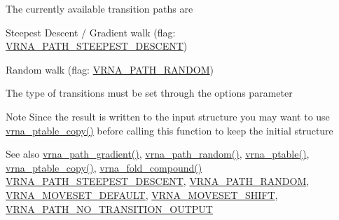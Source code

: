 The currently available transition paths are
\begin{DoxyItemize}
\item Steepest Descent / Gradient walk (flag\+: \hyperlink{group__paths_ga705cea2b3243a38a2d6e3b1e141ed061}{V\+R\+N\+A\+\_\+\+P\+A\+T\+H\+\_\+\+S\+T\+E\+E\+P\+E\+S\+T\+\_\+\+D\+E\+S\+C\+E\+NT})
\item Random walk (flag\+: \hyperlink{group__paths_ga0b84bd36bfd783130297797c51dd85ae}{V\+R\+N\+A\+\_\+\+P\+A\+T\+H\+\_\+\+R\+A\+N\+D\+OM})
\end{DoxyItemize}

The type of transitions must be set through the {\ttfamily options} parameter

\begin{DoxyNote}{Note}
Since the result is written to the input structure you may want to use \hyperlink{group__struct__utils_ga2daefbbd6d9f8803731651882f54332d}{vrna\+\_\+ptable\+\_\+copy()} before calling this function to keep the initial structure
\end{DoxyNote}
\begin{DoxySeeAlso}{See also}
\hyperlink{group__paths_gae92cce443a8a64f7b7fb89867b7d6125}{vrna\+\_\+path\+\_\+gradient()}, \hyperlink{group__paths_ga9234756c337078fa599529d3db70d913}{vrna\+\_\+path\+\_\+random()}, \hyperlink{group__struct__utils_gae829fb8bb7f694c12a9c0bbc34c77c60}{vrna\+\_\+ptable()}, \hyperlink{group__struct__utils_ga2daefbbd6d9f8803731651882f54332d}{vrna\+\_\+ptable\+\_\+copy()}, \hyperlink{group__fold__compound_ga6601d994ba32b11511b36f68b08403be}{vrna\+\_\+fold\+\_\+compound()} \hyperlink{group__paths_ga705cea2b3243a38a2d6e3b1e141ed061}{V\+R\+N\+A\+\_\+\+P\+A\+T\+H\+\_\+\+S\+T\+E\+E\+P\+E\+S\+T\+\_\+\+D\+E\+S\+C\+E\+NT}, \hyperlink{group__paths_ga0b84bd36bfd783130297797c51dd85ae}{V\+R\+N\+A\+\_\+\+P\+A\+T\+H\+\_\+\+R\+A\+N\+D\+OM}, \hyperlink{group__neighbors_gaa5ffec4dd0d02df320f123e6888154d1}{V\+R\+N\+A\+\_\+\+M\+O\+V\+E\+S\+E\+T\+\_\+\+D\+E\+F\+A\+U\+LT}, \hyperlink{group__neighbors_ga68ea27c81de4b74e48b775c04052590b}{V\+R\+N\+A\+\_\+\+M\+O\+V\+E\+S\+E\+T\+\_\+\+S\+H\+I\+FT}, \hyperlink{group__paths_ga1ee63e54ecf136491e12ff03ede2622d}{V\+R\+N\+A\+\_\+\+P\+A\+T\+H\+\_\+\+N\+O\+\_\+\+T\+R\+A\+N\+S\+I\+T\+I\+O\+N\+\_\+\+O\+U\+T\+P\+UT}
\end{DoxySeeAlso}

